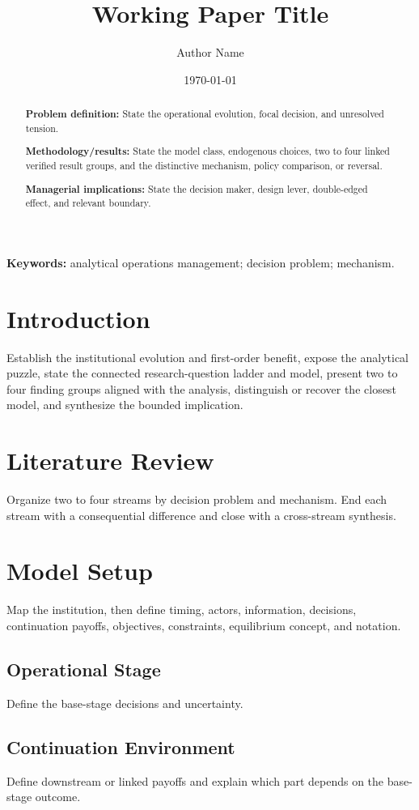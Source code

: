 \documentclass[11pt]{article}
\title{Working Paper Title}
\author{Author Name}
\date{\today}
\begin{document}
\maketitle

\begin{abstract}
\textbf{Problem definition:} State the operational evolution, focal decision, and unresolved tension.

\textbf{Methodology/results:} State the model class, endogenous choices, two to four linked verified result groups, and the distinctive mechanism, policy comparison, or reversal.

\textbf{Managerial implications:} State the decision maker, design lever, double-edged effect, and relevant boundary.
\end{abstract}

\noindent\textbf{Keywords:} analytical operations management; decision problem; mechanism.

\section{Introduction}
Establish the institutional evolution and first-order benefit, expose the analytical puzzle, state the connected research-question ladder and model, present two to four finding groups aligned with the analysis, distinguish or recover the closest model, and synthesize the bounded implication.

\section{Literature Review}
Organize two to four streams by decision problem and mechanism. End each stream with a consequential difference and close with a cross-stream synthesis.

\section{Model Setup}
Map the institution, then define timing, actors, information, decisions, continuation payoffs, objectives, constraints, equilibrium concept, and notation.

\subsection{Operational Stage}
Define the base-stage decisions and uncertainty.

\subsection{Continuation Environment}
Define downstream or linked payoffs and explain which part depends on the base-stage outcome.
\end{document}
